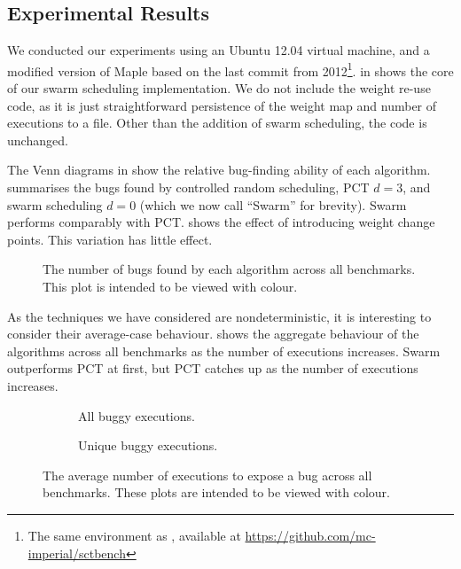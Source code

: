 \subsection{Experimental Results}
\label{sec:algorithms-bench-results}

We conducted our experiments using an Ubuntu 12.04 virtual machine,
and a modified version of Maple based on the last commit from
2012\footnote{The same environment as \cite{thomson2016}, available at
  \url{https://github.com/mc-imperial/sctbench}}.   in
 shows the core of our swarm scheduling
implementation.  We do not include the weight re-use code, as it is
just straightforward persistence of the weight map and number of
executions to a file.  Other than the addition of swarm scheduling,
the code is unchanged.

The Venn diagrams in  show the relative bug-finding
ability of each algorithm.   summarises the bugs
found by controlled random scheduling, PCT $d=3$, and swarm scheduling
$d=0$ (which we now call ``Swarm'' for brevity).  Swarm performs
comparably with PCT.   shows the effect of
introducing weight change points.  This variation has little effect.

\begin{figure}
  \centering
  
  \caption[Plot of bugs found by each scheduling algorithm.]{The number of bugs found by each algorithm across all benchmarks.  This plot is intended to be viewed with colour.}\label{fig:totalbugs}
\end{figure}

As the techniques we have considered are nondeterministic, it is
interesting to consider their average-case behaviour.
 shows the aggregate behaviour of the algorithms
across all benchmarks as the number of executions increases.  Swarm
outperforms PCT at first, but PCT catches up as the number of
executions increases.

\begin{figure}
  \centering
  \begin{subfigure}{0.49\textwidth}
    \centering
    \resizebox{\textwidth}{!}{}
    \caption{All buggy executions.}\label{fig:freqbugs-total}
  \end{subfigure}
  \begin{subfigure}{0.49\textwidth}
    \centering
    \resizebox{\textwidth}{!}{}
    \caption{Unique buggy executions.}\label{fig:freqbugs-unique}
  \end{subfigure}
  \caption[Plot of average number of executions needed to expose a bug.]{The average number of executions to expose a bug across all benchmarks.  These plots are intended to be viewed with colour.}\label{fig:freqbugs}
\end{figure}

